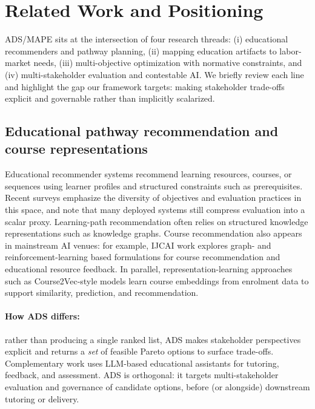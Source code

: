 \documentclass{article}
\newcommand{\ADS}{\textsc{ADS}\xspace}
\newcommand{\MAPE}{\textsc{MAPE}\xspace}
\begin{document}
\section{Related Work and Positioning}
\label{sec:related}
\ADS/\MAPE sits at the intersection of four research threads: (i) educational recommenders and pathway planning, (ii) mapping education artifacts to labor-market needs, (iii) multi-objective optimization with normative constraints, and (iv) multi-stakeholder evaluation and contestable AI. We briefly review each line and highlight the gap our framework targets: making stakeholder trade-offs explicit and governable rather than implicitly scalarized.

\subsection{Educational pathway recommendation and course representations}
Educational recommender systems recommend learning resources, courses, or sequences using learner profiles and structured constraints such as prerequisites. Recent surveys emphasize the diversity of objectives and evaluation practices in this space, and note that many deployed systems still compress evaluation into a scalar proxy.\cite{dasilva2022slrERS,aucancela2023ersslr}
Learning-path recommendation often relies on structured knowledge representations such as knowledge graphs.\cite{shi2020}
Course recommendation also appears in mainstream AI venues: for example, IJCAI work explores graph- and reinforcement-learning based formulations for course recommendation and educational resource feedback.\cite{hhcor2024,dfrp2024}
In parallel, representation-learning approaches such as Course2Vec-style models learn course embeddings from enrolment data to support similarity, prediction, and recommendation.\cite{morsy2019course2vec,jiang2020multifactorCourse2vec,xu2023courseEmbeddings}
\paragraph{How ADS differs:} rather than producing a single ranked list, \ADS makes stakeholder perspectives explicit and returns a \emph{set} of feasible Pareto options to surface trade-offs.
Complementary work uses LLM-based educational assistants for tutoring, feedback, and assessment.\cite{coderagent2025,collabAgents2025,llmGrading2025,handByHand2025,livepoem2025} \ADS is orthogonal: it targets multi-stakeholder evaluation and governance of candidate options, before (or alongside) downstream tutoring or delivery.
\end{document}
